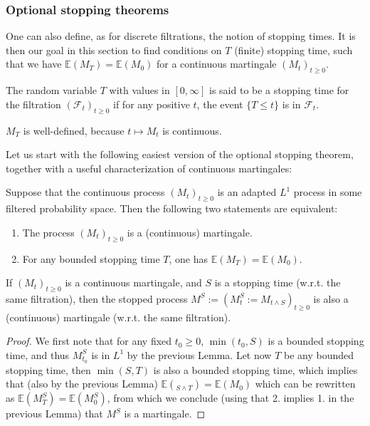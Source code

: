\documentclass[../mainfile.tex]{subfiles}
\begin{document}
\subsubsection{Optional stopping theorems}
One can also define, as for discrete filtrations, the notion of stopping times. It is then our goal in this section to find conditions on $T$ (finite) stopping time, such that we have $\mathbb{E}(M_T)=\mathbb{E}(M_0)$ for a continuous martingale $(M_t)_{t \geq 0}$. 
\begin{defn} The random variable $T$ with values in $[0, \infty]$ is said to be a stopping time for the filtration $( \mathcal{F}_t)_{t \geq 0}$ if for any positive $t$, the event $\{T \leq t \}$ is in $\mathcal{F}_t$. 
\end{defn}
\begin{rem} $M_T$ is well-defined, because $t \mapsto M_t$ is continuous. 
\end{rem}
Let us start with the following easiest version of the optional stopping theorem, together with a useful characterization of continuous martingales:
\begin{lem} Suppose that the continuous process $(M_t)_{t \geq 0}$ is an adapted $L^1$ process in some filtered probability space. Then the following two statements are equivalent:
\begin{enumerate}
\item The process $(M_t)_{t \geq 0}$ is a (continuous) martingale.
\item For any bounded stopping time $T$, one has $\mathbb{E}(M_T)= \mathbb{E}(M_0).$
\end{enumerate}
\end{lem}
\begin{cor} If $(M_t)_{t \geq 0}$ is a continuous martingale, and $S$ is a stopping time (w.r.t. the same filtration), then the stopped process $M^S:= (M_t^S:=M_{t \wedge S})_{t \geq 0}$ is also a (continuous) martingale (w.r.t. the same filtration).
\end{cor}
\begin{proof}
We first note that for any fixed $t_0 \geq 0$, $\min(t_0,S)$ is a bounded stopping time,  and thus $M_{t_0}^S$ is in $L^1$ by the previous Lemma. Let now $T$ be any bounded stopping time, then $\min(S,T)$ is also a bounded stopping time,  which implies that  (also by the previous Lemma) $\mathbb{E}(_{S \wedge T})= \mathbb{E}(M_0)$ which can be rewritten as $\mathbb{E}(M_T^S)= \mathbb{E}(M_0^S)$,  from which we conclude (using that 2. implies 1. in the previous Lemma) that $M^S$ is a martingale. 
\end{proof}
\end{document}
